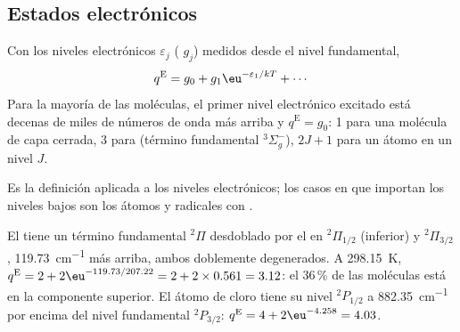 \subsection*{Estados electrónicos}

\begin{proposition}\label{prop:b3:partition-functions:q-elec}
Con los niveles electrónicos $\varepsilon_j$ ( $g_j$) medidos desde el nivel
fundamental,
\[
  q^{\mathrm E} = g_0 + g_1\eu^{-\varepsilon_1/kT} + \cdots
\]
Para la mayoría de las moléculas, el primer nivel electrónico excitado está decenas de miles de
números de onda más arriba y $q^{\mathrm E} = g_0$: 1 para una molécula de capa cerrada, 3 para
 (término fundamental ${}^3\Sigma_g^-$), $2J + 1$ para un átomo en un nivel $J$.
\end{proposition}

Es la definición aplicada a los niveles electrónicos; los casos en que importan los niveles
bajos son los átomos y radicales con .

\begin{example}\label{ex:b3:partition-functions:no-cl}
El  tiene un término fundamental ${}^2\Pi$ desdoblado por el  en ${}^2\Pi_{1/2}$ (inferior)
y ${}^2\Pi_{3/2}$, \qty{119.73}{cm^{-1}} más arriba, ambos doblemente degenerados. A \qty{298.15}{K},
$q^{\mathrm E} = 2 + 2\eu^{-119.73/207.22} = 2 + 2\times0.561 = 3.12$: el 36\,\% de las moléculas está en
la componente superior. El átomo de cloro tiene su nivel ${}^2P_{1/2}$ a \qty{882.35}{cm^{-1}}
por encima del nivel fundamental ${}^2P_{3/2}$: $q^{\mathrm E} = 4 + 2\eu^{-4.258} = 4.03$.
\end{example}

